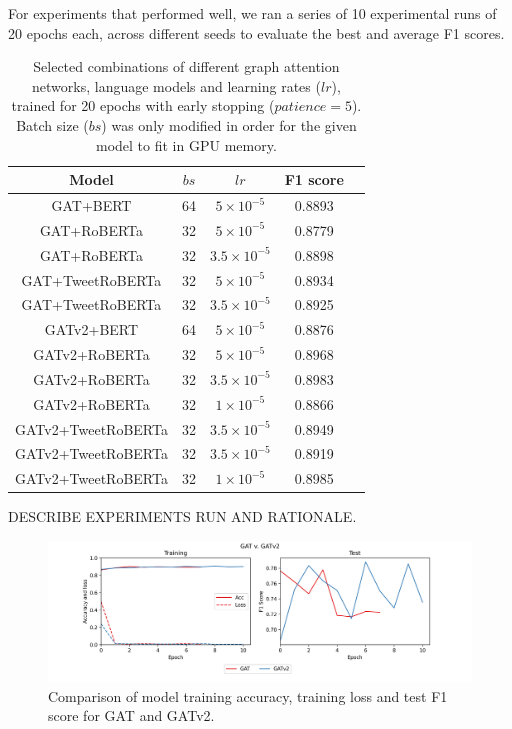 \documentclass[letterpaper]{article} %
\begin{document}
For experiments that performed well, we ran a series of 10 experimental runs of 20 epochs each, across different seeds to evaluate the best and average F1 scores.
\begin{table}
    \begin{tabular}{|c|c|c|c|c|}
        \hline
        \hline 
        Model & $bs$ & $lr$ & F1 score \\
        \hline
        GAT+BERT & 64 & $5\times10^{-5}$ &  0.8893 \\
        GAT+RoBERTa & 32 & $5\times10^{-5}$ &  0.8779 \\
        GAT+RoBERTa & 32 & $3.5\times10^{-5}$ &  0.8898 \\
        GAT+TweetRoBERTa & 32 & $5\times10^{-5}$  & 0.8934 \\
        GAT+TweetRoBERTa & 32 & $3.5\times10^{-5}$  & 0.8925 \\
        GATv2+BERT & 64 & $5\times10^{-5}$  & 0.8876 \\
        GATv2+RoBERTa & 32 & $5\times10^{-5}$ &  0.8968 \\
        GATv2+RoBERTa & 32 & $3.5\times10^{-5}$ &  0.8983 \\
        GATv2+RoBERTa & 32 & $1\times10^{-5}$ &  0.8866 \\
        GATv2+TweetRoBERTa & 32 & $3.5\times10^{-5}$  & 0.8949 \\
        GATv2+TweetRoBERTa & 32 & $3.5\times10^{-5}$  & 0.8919 \\
        GATv2+TweetRoBERTa & 32 & $1\times10^{-5}$  & 0.8985 \\
        \hline
    \end{tabular}
    \caption{Selected combinations of different graph attention networks, language models and learning rates ($lr$), trained for 20 epochs with early stopping ($patience=5$). Batch size ($bs$) was only modified in order for the given model to fit in GPU memory.}
\end{table}

DESCRIBE EXPERIMENTS RUN AND RATIONALE.
\begin{figure}
    \includegraphics[width=\linewidth]{gat_v_gatv2.png}
    \caption{Comparison of model training accuracy, training loss and test F1 score for GAT and GATv2.}
\end{figure}
\end{document}
